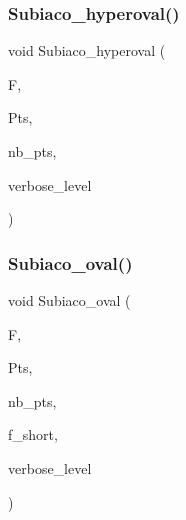 \mbox{\label{data_8_c_a7653c4fab644da8c6527a23977f3670f}} 
\subsubsection{\texorpdfstring{Subiaco\+\_\+hyperoval()}{Subiaco\_hyperoval()}}
{\footnotesize\ttfamily void Subiaco\+\_\+hyperoval (\begin{DoxyParamCaption}\item[{\mbox{\hyperlink{classfinite__field}{finite\+\_\+field}} $\ast$}]{F,  }\item[{\mbox{\hyperlink{galois_8h_a09fddde158a3a20bd2dcadb609de11dc}{I\+NT}} $\ast$\&}]{Pts,  }\item[{\mbox{\hyperlink{galois_8h_a09fddde158a3a20bd2dcadb609de11dc}{I\+NT}} \&}]{nb\+\_\+pts,  }\item[{\mbox{\hyperlink{galois_8h_a09fddde158a3a20bd2dcadb609de11dc}{I\+NT}}}]{verbose\+\_\+level }\end{DoxyParamCaption})}

\mbox{\label{data_8_c_aad60d8b485bc6d324431f2ee7a543cb1}} 
\subsubsection{\texorpdfstring{Subiaco\+\_\+oval()}{Subiaco\_oval()}}
{\footnotesize\ttfamily void Subiaco\+\_\+oval (\begin{DoxyParamCaption}\item[{\mbox{\hyperlink{classfinite__field}{finite\+\_\+field}} $\ast$}]{F,  }\item[{\mbox{\hyperlink{galois_8h_a09fddde158a3a20bd2dcadb609de11dc}{I\+NT}} $\ast$\&}]{Pts,  }\item[{\mbox{\hyperlink{galois_8h_a09fddde158a3a20bd2dcadb609de11dc}{I\+NT}} \&}]{nb\+\_\+pts,  }\item[{\mbox{\hyperlink{galois_8h_a09fddde158a3a20bd2dcadb609de11dc}{I\+NT}}}]{f\+\_\+short,  }\item[{\mbox{\hyperlink{galois_8h_a09fddde158a3a20bd2dcadb609de11dc}{I\+NT}}}]{verbose\+\_\+level }\end{DoxyParamCaption})}

